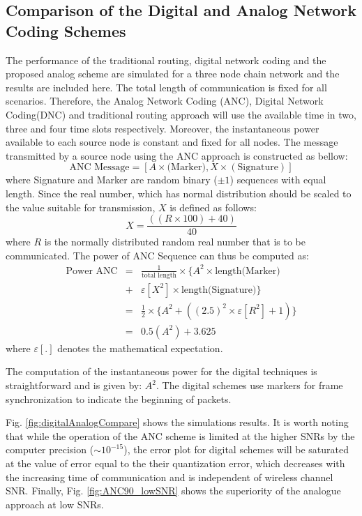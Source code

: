 \documentclass[conference]{IEEEtran}
\begin{document}
\subsection{Comparison of the Digital and Analog Network Coding Schemes}\label{sim:comparison}
The performance of the traditional routing, digital network coding and the proposed analog scheme are simulated for a three node chain network and the results are included here. The total length of communication is fixed for all scenarios. Therefore, the Analog Network Coding (ANC), Digital Network Coding(DNC) and traditional routing approach will use the available time in two, three and four time slots respectively. Moreover, the instantaneous power available to each source node is constant and fixed for all nodes. The message transmitted by a source node using the ANC approach is constructed as bellow: 
\begin{equation}
\mbox{ANC Message} = [A \times \mbox{(Marker)}, X\times (\mbox{Signature})]
\label{ANCmessage}
\end{equation}
where Signature and Marker are random binary ($\pm 1$) sequences with equal length. Since the real number, which has normal distribution should be scaled to the value suitable for transmission, $X$ is defined as follows:
\begin{equation}
X =\frac{((R \times 100)+40)}{40}
\label{scaling}
\end{equation}
where $R$ is the normally distributed random real number that is to be communicated.
The power of ANC Sequence can thus be computed as:
\begin{eqnarray}
\mbox{Power ANC} &=& \frac{1}{\mbox{total length}} \times \{A ^2 \times \mbox{length(Marker)}     \nonumber \\ 
								 &+& \varepsilon \left[ X^2 \right] \times \mbox{length(Signature)} \} \nonumber \\
                 &=& \frac{1}{2} \times \{ A^2 + (({2.5})^2 \times \varepsilon \left[ R^2 \right] +1 )  \} \nonumber  \\
                 &=& 0.5 \left( A^2 \right)  +  3.625 
\label{powerANC}
\end{eqnarray}
where $\varepsilon[.]$ denotes the mathematical expectation.

The computation of the instantaneous power for the digital techniques is straightforward and is given by: $A^2$. The digital schemes use markers for frame synchronization to indicate the beginning of packets.

Fig. \ref{fig:digitalAnalogCompare} shows the simulations results. It is worth noting that while the operation of the ANC scheme is limited at the higher SNRs by the computer precision ($\sim 10^{-15}$), the error plot for digital schemes will be saturated at the value of error equal to the their quantization error, which decreases with the increasing time of communication and is independent of wireless channel SNR. Finally, Fig. \ref{fig:ANC90_lowSNR} shows the superiority of the analogue approach at low SNRs. 
\end{document}
